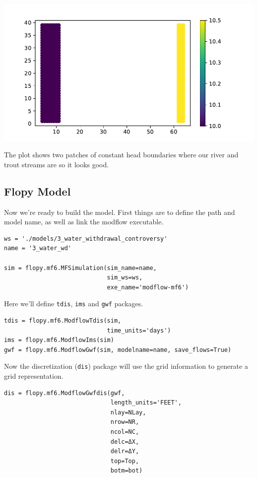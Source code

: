 \documentclass[titlepage,12pt]{unisubmission}
\begin{document}
\begin{center}
\includegraphics[width=.9\linewidth]{./images/3_chd.pdf}
\end{center}

The plot shows two patches of constant head boundaries where our river and trout streams are so it looks good.


\subsection{Flopy Model}
\label{sec:orgbbb9f8c}

Now we're ready to build the model. First things are to define the path and model name, as well as link the modflow executable.

\begin{verbatim}
ws = './models/3_water_withdrawal_controversy'
name = '3_water_wd'

sim = flopy.mf6.MFSimulation(sim_name=name,
                             sim_ws=ws,
                             exe_name='modflow-mf6')
\end{verbatim}

Here we'll define \texttt{tdis}, \texttt{ims} and \texttt{gwf} packages.

\begin{verbatim}
tdis = flopy.mf6.ModflowTdis(sim,
                             time_units='days')
ims = flopy.mf6.ModflowIms(sim)
gwf = flopy.mf6.ModflowGwf(sim, modelname=name, save_flows=True)
\end{verbatim}

Now the discretization (\texttt{dis}) package will use the grid information to generate a grid representation.

\begin{verbatim}
dis = flopy.mf6.ModflowGwfdis(gwf,
                              length_units='FEET',
                              nlay=NLay,
                              nrow=NR,
                              ncol=NC,
                              delc=ΔX,
                              delr=ΔY,
                              top=Top,
                              botm=bot)
\end{verbatim}
\end{document}
